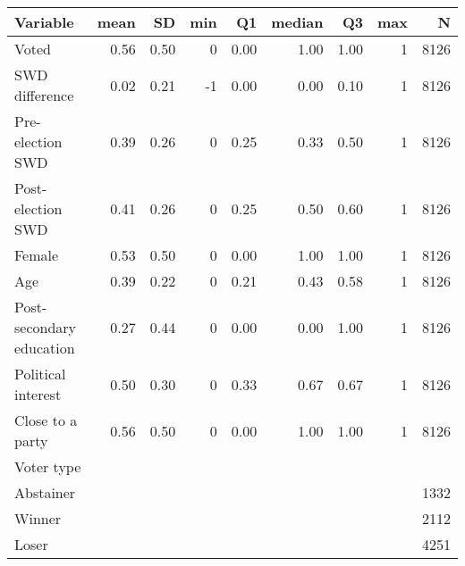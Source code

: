 
\begin{tabular}{l|r|r|r|r|r|r|r|r}
\hline
Variable & mean & SD & min & Q1 & median & Q3 & max & N\\
\hline
Voted & 0.56 & 0.50 & 0 & 0.00 & 1.00 & 1.00 & 1 & 8126\\
\hline
SWD difference & 0.02 & 0.21 & -1 & 0.00 & 0.00 & 0.10 & 1 & 8126\\
\hline
Pre-election SWD & 0.39 & 0.26 & 0 & 0.25 & 0.33 & 0.50 & 1 & 8126\\
\hline
Post-election SWD & 0.41 & 0.26 & 0 & 0.25 & 0.50 & 0.60 & 1 & 8126\\
\hline
Female & 0.53 & 0.50 & 0 & 0.00 & 1.00 & 1.00 & 1 & 8126\\
\hline
Age & 0.39 & 0.22 & 0 & 0.21 & 0.43 & 0.58 & 1 & 8126\\
\hline
Post-secondary education & 0.27 & 0.44 & 0 & 0.00 & 0.00 & 1.00 & 1 & 8126\\
\hline
Political interest & 0.50 & 0.30 & 0 & 0.33 & 0.67 & 0.67 & 1 & 8126\\
\hline
Close to a party & 0.56 & 0.50 & 0 & 0.00 & 1.00 & 1.00 & 1 & 8126\\
\hline
Voter type &  &  &  &  &  &  &  & \\
\hline
Abstainer &  &  &  &  &  &  &  & 1332\\
\hline
Winner &  &  &  &  &  &  &  & 2112\\
\hline
Loser &  &  &  &  &  &  &  & 4251\\
\hline
\end{tabular}
